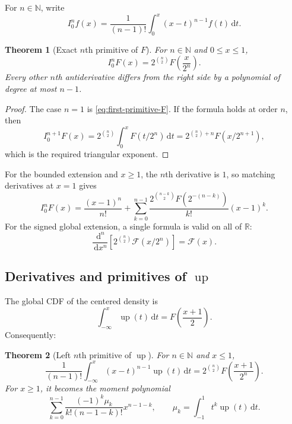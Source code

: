 \documentclass[11pt,oneside]{article}
\newtheorem{theorem}{Theorem}[section]
\theoremstyle{definition}
\theoremstyle{remark}
\newcommand{\R}{\mathbb R}
\newcommand{\N}{\mathbb N}
\newcommand{\dd}{\,\mathrm d}
\newcommand{\upf}{\operatorname{up}}
\begin{document}
For $n\in\N$, write
\begin{equation}\label{eq:In-definition}
 I_0^nf(x)=\frac1{(n-1)!}\int_0^x(x-t)^{n-1}f(t)\dd t.
\end{equation}

\begin{theorem}[Exact $n$th primitive of $F$]\label{thm:nth-primitive-F}
For $n\in\N$ and $0\le x\le1$,
\begin{equation}\label{eq:nth-primitive-F}
\boxed{
 I_0^nF(x)=2^{\binom n2}F\!\left(\frac{x}{2^n}\right).}
\end{equation}
Every other $n$th antiderivative differs from the right side by a polynomial of degree at most $n-1$.
\end{theorem}

\begin{proof}
The case $n=1$ is \eqref{eq:first-primitive-F}.  If the formula holds at order $n$, then
\[
 I_0^{n+1}F(x)=2^{\binom n2}\int_0^xF(t/2^n)\dd t
 =2^{\binom n2+n}F(x/2^{n+1}),
\]
which is the required triangular exponent.
\end{proof}

For the bounded extension and $x\ge1$, the $n$th derivative is $1$, so matching derivatives at $x=1$ gives
\begin{equation}\label{eq:nth-primitive-F-tail}
 I_0^nF(x)=\frac{(x-1)^n}{n!}
 +\sum_{k=0}^{n-1}
 \frac{2^{\binom{n-k}{2}}F(2^{-(n-k)})}{k!}(x-1)^k.
\end{equation}
For the signed global extension, a single formula is valid on all of $\R$:
\begin{equation}\label{eq:signed-nth-antiderivative}
 \frac{\dd^n}{\dd x^n}
 \left[2^{\binom n2}\mathcal F(x/2^n)\right]
 =\mathcal F(x).
\end{equation}

\subsection{Derivatives and primitives of $\upf$}

The global CDF of the centered density is
\begin{equation}\label{eq:up-first-primitive}
 \int_{-\infty}^{x}\upf(t)\dd t
 =F\!\left(\frac{x+1}{2}\right).
\end{equation}
Consequently:

\begin{theorem}[Left $n$th primitive of $\upf$]\label{thm:nth-primitive-up}
For $n\in\N$ and $x\le1$,
\begin{equation}\label{eq:nth-primitive-up}
\boxed{
 \frac1{(n-1)!}\int_{-\infty}^{x}(x-t)^{n-1}\upf(t)\dd t
 =2^{\binom n2}F\!\left(\frac{x+1}{2^n}\right).}
\end{equation}
For $x\ge1$, it becomes the moment polynomial
\begin{equation}\label{eq:nth-primitive-up-tail}
 \sum_{k=0}^{n-1}
 \frac{(-1)^k\mu_k}{k!(n-1-k)!}x^{n-1-k},
 \qquad
 \mu_k=\int_{-1}^{1}t^k\upf(t)\dd t.
\end{equation}
\end{theorem}
\end{document}
